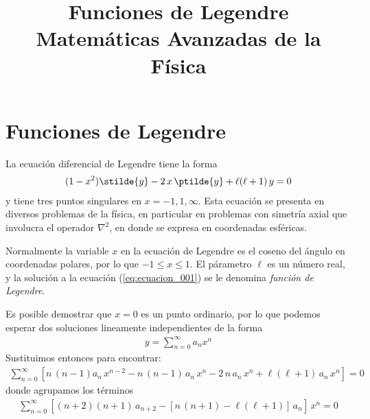 
\usepackage{standalone}
\usepackage{tikz}   
\usepackage{tikz-3dplot}
\usepackage{mathrsfs}
\usepackage{bigints}
\title{Funciones de Legendre \\ {\large Matemáticas Avanzadas de la Física}}
\date{ }

\renewcommand\labelenumii{\theenumi.{\arabic{enumii}}}
\maketitle
\fontsize{14}{14}\selectfont
\section{Funciones de Legendre}
La ecuación diferencial de Legendre tiene la forma
\begin{align}
(1 - x^{2}) \stilde{y} - 2 \, x \, \ptilde{y} + \ell (\ell + 1) \, y = 0
\label{eq:ecuacion_18_01}
\end{align}
y tiene tres puntos singulares en $x = -1, 1, \infty$. Esta ecuación se presenta en diversos problemas de la física, en particular en problemas con simetría axial que involucra el operador $\nabla^{2}$, en donde se expresa en coordenadas esféricas.
\par
Normalmente la variable $x$ en la ecuación de Legendre es el coseno del ángulo en coordenadas polares, por lo que $-1 \leq x \leq 1$. El párametro $\ell$ es un número real, y la solución a la ecuación (\ref{eq:ecuacion_001}) se le denomina \emph{función de Legendre}.
\par
Es posible demostrar que $x = 0$ es un punto ordinario, por lo que podemos esperar dos soluciones lineamente independientes de la forma
\begin{align*}
y = \sum_{n=0}^{\infty} a_{n} x^{n}
\end{align*}
Sustituimos entonces para encontrar:
\begin{align*}
\sum_{n=0}^{\infty} \left[ n \, (n - 1) a_{n} \, x^{n-2} - n \, (n - 1) \, a_{n} \, x^{n} - 2 \, n \, a_{n} \, x^{n} + \ell (\ell + 1) \, a_{n} \, x^{n} \right] = 0
\end{align*}
donde agrupamos los términos
\begin{align*}
\sum_{n=0}^{\infty} \left[ (n + 2)(n + 1) \, a_{n+2} - [ n \, (n+1) - \ell (\ell + 1) ] \, a_{n} \right] \, x^{n} = 0
\end{align*}
